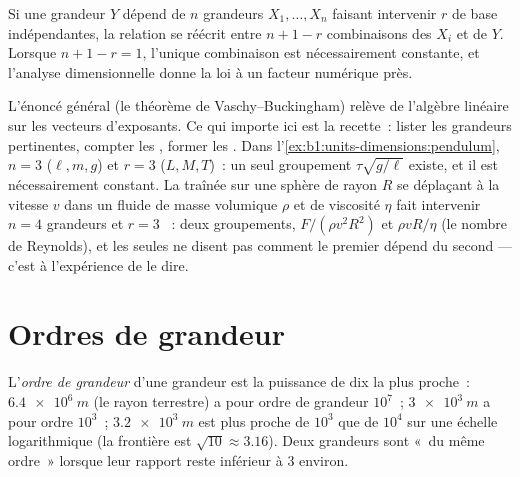 \begin{proposition}\label{prop:b1:units-dimensions:pi}
Si une grandeur $Y$ dépend de $n$ grandeurs $X_1, \dots, X_n$ faisant
intervenir $r$  de base indépendantes, la relation se réécrit
entre $n + 1 - r$ combinaisons  des $X_i$ et de $Y$.
Lorsque $n + 1 - r = 1$, l'unique combinaison est nécessairement
constante, et l'analyse dimensionnelle donne la loi à un facteur
numérique près.
\end{proposition}
\admitted

\begin{remark}\label{rem:b1:units-dimensions:pi}
L'énoncé général (le théorème de Vaschy--Buckingham) relève de l'algèbre
linéaire sur les vecteurs d'exposants. Ce qui importe ici est la
recette~: lister les grandeurs pertinentes, compter les ,
former les . Dans
l'\cref{ex:b1:units-dimensions:pendulum}, $n = 3$ ($\ell, m, g$) et
$r = 3$ ($L, M, T$)~: un seul groupement $\tau\sqrt{g/\ell}$ existe, et
il est nécessairement constant. La traînée sur une sphère de rayon $R$
se déplaçant à la vitesse $v$ dans un fluide de masse volumique $\rho$
et de viscosité $\eta$ fait intervenir $n = 4$ grandeurs et $r = 3$
~: deux groupements, $F/(\rho v^2 R^2)$ et $\rho v R/\eta$ (le
nombre de Reynolds), et les  seules ne disent pas comment le
premier dépend du second --- c'est à l'expérience de le dire.
\end{remark}

\section{Ordres de grandeur}

\begin{definition}\label{def:b1:units-dimensions:oom}
L'\emph{ordre de grandeur} d'une grandeur est la puissance de dix la
plus proche~: $\qty{6.4e6}{m}$ (le rayon terrestre) a pour ordre de
grandeur $10^7$~; $\qty{3e3}{m}$ a pour ordre $10^3$~; $\qty{3.2e3}{m}$
est plus proche de $10^3$ que de $10^4$ sur une échelle logarithmique
(la frontière est $\sqrt{10} \approx 3.16$). Deux grandeurs sont «~du
même ordre~» lorsque leur rapport reste inférieur à $3$ environ.
\end{definition}

